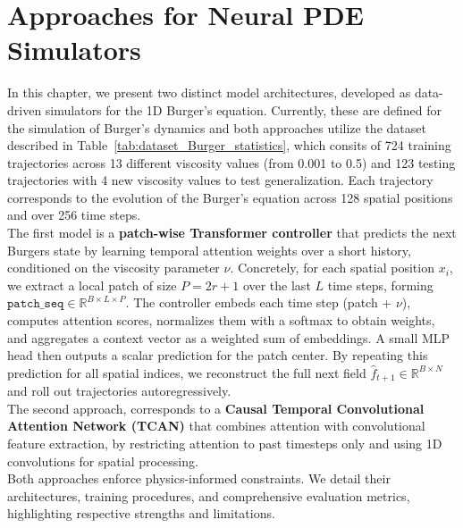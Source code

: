 \usetikzlibrary{positioning, shapes.geometric, arrows.meta}
\chapter{Approaches for Neural PDE Simulators}
\label{chap:approaches}

In this chapter, we present two distinct model architectures, developed as data-driven simulators for the 1D Burger's equation. Currently, these are defined for the simulation of Burger's dynamics and both approaches utilize the dataset described in Table~\ref{tab:dataset_Burger_statistics}, which consits of 724 training trajectories across 13 different viscosity values (from 0.001 to 0.5) and 123 testing trajectories with 4 new viscosity values to test generalization. Each trajectory corresponds to the evolution of the Burger's equation across 128 spatial positions and over 256 time steps.\\
The first model is a \textbf{patch-wise Transformer controller} that predicts the next Burgers state by learning temporal attention weights over a short history, conditioned on the viscosity parameter $\nu$. Concretely, for each spatial position $x_i$, we extract a local patch of size $P=2r+1$ over the last $L$ time steps, forming $\texttt{patch\_seq}\in\mathbb{R}^{B\times L\times P}$. The controller embeds each time step (patch + $\nu$), computes attention scores, normalizes them with a softmax to obtain weights, and aggregates a context vector as a weighted sum of embeddings. A small MLP head then outputs a scalar prediction for the patch center. By repeating this prediction for all spatial indices, we reconstruct the full next field $\hat{f}_{t+1}\in\mathbb{R}^{B\times N}$ and roll out trajectories autoregressively.\\
The second approach, corresponds to a \textbf{Causal Temporal Convolutional Attention Network (TCAN)} that combines attention with convolutional feature extraction, by restricting attention to past timesteps only and using 1D convolutions for spatial processing.\\
Both approaches enforce physics-informed constraints. We detail their architectures, training procedures, and comprehensive evaluation metrics, highlighting respective strengths and limitations.

